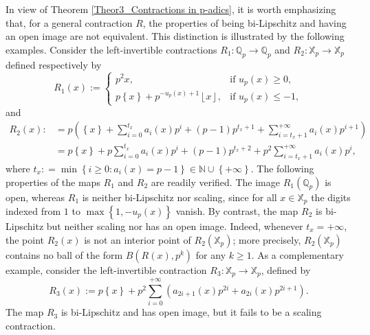 \documentclass[a4paper, 12pt]{article}
\theoremstyle{definition}
\begin{document}
	
	In view of Theorem \ref{Theor3_Contractions in p-adics}, it is worth emphasizing that, for a general contraction $R$, the properties of being bi-Lipschitz and having an open image are not equivalent. This distinction is illustrated by the following examples. Consider the left-invertible contractions $R_{1}: \mathbb{Q}_{p}  \to \mathbb{Q}_{p}$ and $R_{2}: \mathbb{X}_{p} \to \mathbb{X}_{p}$ defined respectively by 
	$$ R_{1} \left(  x  \right)  :=   \begin{cases}
		p^{2} x, & \text{if } u_{p} \left(  x  \right)  \ge 0,  \\ 
		p  \left\{  x  \right\}  + p^{-u_{p} \left(  x  \right)  +1}  \left\lfloor  x   \right\rfloor, & \text{if } u_{p} \left(  x  \right)  \le - 1, 
	\end{cases}$$
	and 
	\begin{align*}
		R_{2} \left(  x  \right)  :&= p \left(   \left\{  x  \right\}  + \sum_{i=0}^{t_{x}} a_{i} \left(  x  \right)  p^{i} +  \left(  p-1  \right)  p^{t_{x} +1} + \sum_{i = t_{x} + 1}^{+ \infty } a_{i} \left(  x  \right)  p^{i+1}  \right)    \\ 
		&= p \left\{  x  \right\}  + p  \sum_{i=0}^{t_{x}} a_{i} \left(  x  \right)  p^{i} +  \left(  p-1  \right)  p^{t_{x} +2} + p^{2} \sum_{i = t_{x} +1}^{+ \infty } a_{i} \left(  x  \right)  p^{i},
	\end{align*} 
	where $t_{x} : = \min \left\{  i \ge 0 :   a_{i} \left(  x  \right)  = p - 1 \right\}  \in \mathbb{N} \cup  \left\{  + \infty   \right\} $. 
	The following properties of the maps $R_{1}$ and $R_{2}$ are readily verified. 
	The  image $R_{1} \left(  \mathbb{Q}_{p}  \right) $ is open, whereas $R_{1}$ is neither bi-Lipschitz nor scaling, since for all $x \in \mathbb{X}_{p}$ the digits indexed from $1$ to $\max \left\{  1, - u_{p} \left(  x  \right)   \right\} $ vanish. By contrast, the map $R_{2}$ is bi-Lipschitz but neither scaling nor has an open image. 
	Indeed, whenever $t_{x} = + \infty $, the point $R_{2} \left(  x  \right) $ is not an interior point of $R_{2} \left(  \mathbb{X}_{p}  \right) $; more precisely, $R_{2} \left(  \mathbb{X}_{p}  \right) $ contains no ball of the form $B \left(  R \left(  x  \right) , p^{k}  \right) $ for any $k \ge 1$. 
	As a complementary example, consider the left-invertible contraction $R_{3}: \mathbb{X}_{p} \to \mathbb{X}_{p}$, defined by  
	$$ R_{3} \left(  x  \right)  :=   p  \left\{  x  \right\}  + p^{2} \sum_{i=0}^{+ \infty }  \left(   a_{2i + 1} \left(  x  \right)  p^{2i} + a_{2i} \left(  x \right)  p^{2i +1 }   \right)  .$$
	The map $R_{3}$ is bi-Lipschitz and has open image, but it fails to be a scaling contraction.  
	
\end{document}
